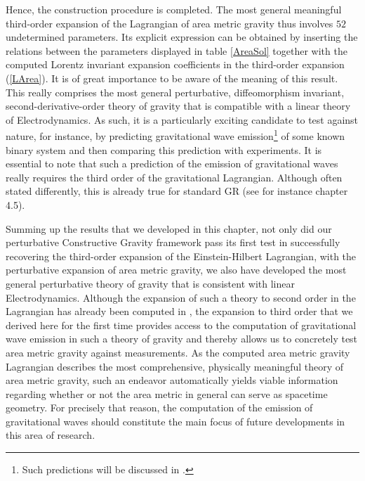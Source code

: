 Hence, the construction procedure is completed. The most general meaningful third-order expansion of the Lagrangian of area metric gravity thus involves $52$ undetermined parameters. Its explicit expression can be obtained by inserting the relations between the parameters displayed in table \ref{AreaSol} together with the computed Lorentz invariant expansion coefficients in the third-order expansion (\ref{LArea}). It is of great importance to be aware of the meaning of this result. This really comprises the most general perturbative, diffeomorphism invariant, second-derivative-order theory of gravity that is compatible with a linear theory of Electrodynamics. As such, it is a particularly exciting candidate to test against nature, for instance, by predicting gravitational wave emission\footnote{Such predictions will be discussed in \cite{NilsPHD}.} of some known binary system and then comparing this prediction with experiments. It is essential to note that such a prediction of the emission of gravitational waves really requires the third order of the gravitational Lagrangian. Although often stated differently, this is already true for standard GR (see for instance \cite{1984grra.book.....S} chapter 4.5).

Summing up the results that we developed in this chapter, not only did our perturbative Constructive Gravity framework pass its first test in successfully recovering the third-order expansion of the Einstein-Hilbert Lagrangian, with the perturbative expansion of area metric gravity, we also have developed the most general perturbative theory of gravity that is consistent with linear Electrodynamics. Although the expansion of such a theory to second order in the Lagrangian has already been computed in \cite{2017arXiv170803870S}, the expansion to third order that we derived here for the first time provides access to the computation of gravitational wave emission in such a theory of gravity and thereby allows us to concretely test area metric gravity against measurements.
As the computed area metric gravity Lagrangian describes the most comprehensive, physically meaningful theory of area metric gravity, such an endeavor automatically yields viable information regarding whether or not the area metric in general can serve as spacetime geometry.
For precisely that reason, the computation of the emission of gravitational waves should constitute the main focus of future developments in this area of research. 